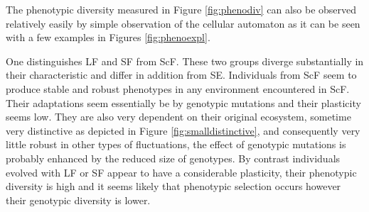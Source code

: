 The phenotypic diversity measured in Figure \ref{fig:phenodiv} can also be observed relatively easily by simple observation of the cellular automaton as it can be seen with a few examples in Figures \ref{fig:phenoexpl}. 


One distinguishes LF and SF from ScF. These two groups diverge substantially in their characteristic and differ in addition from SE. Individuals from ScF seem to produce stable and robust phenotypes in any environment encountered in ScF. Their adaptations seem essentially be by genotypic mutations and their plasticity seems low. They are also very dependent on their original ecosystem, sometime very distinctive as depicted in Figure \ref{fig:smalldistinctive}, and consequently very little robust in other types of fluctuations, the effect of genotypic mutations is probably enhanced by the reduced size of genotypes. By contrast individuals evolved with LF or SF appear to have a considerable plasticity, their phenotypic diversity is high and it seems likely that phenotypic selection occurs however their genotypic diversity is lower.

